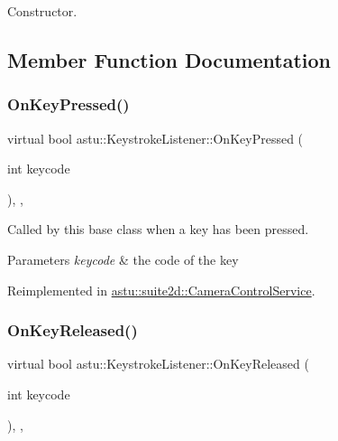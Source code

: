 Constructor. 

\subsection{Member Function Documentation}
\mbox{\label{classastu_1_1KeystrokeListener_ad4bb14ad1fd43fd200411353eeb99b5a}} 
\subsubsection{\texorpdfstring{On\+Key\+Pressed()}{OnKeyPressed()}}
{\footnotesize\ttfamily virtual bool astu\+::\+Keystroke\+Listener\+::\+On\+Key\+Pressed (\begin{DoxyParamCaption}\item[{int}]{keycode }\end{DoxyParamCaption})\hspace{0.3cm}{\ttfamily [inline]}, {\ttfamily [protected]}, {\ttfamily [virtual]}}

Called by this base class when a key has been pressed.


\begin{DoxyParams}{Parameters}
{\em keycode} & the code of the key \\
\hline
\end{DoxyParams}


Reimplemented in \hyperlink{classastu_1_1suite2d_1_1CameraControlService_aa0a09cd56307bfab4b410ed06ffa5c74}{astu\+::suite2d\+::\+Camera\+Control\+Service}.

\mbox{\label{classastu_1_1KeystrokeListener_ae9c5d19ae49d2e340ed7f832e1efab03}} 
\subsubsection{\texorpdfstring{On\+Key\+Released()}{OnKeyReleased()}}
{\footnotesize\ttfamily virtual bool astu\+::\+Keystroke\+Listener\+::\+On\+Key\+Released (\begin{DoxyParamCaption}\item[{int}]{keycode }\end{DoxyParamCaption})\hspace{0.3cm}{\ttfamily [inline]}, {\ttfamily [protected]}, {\ttfamily [virtual]}}

